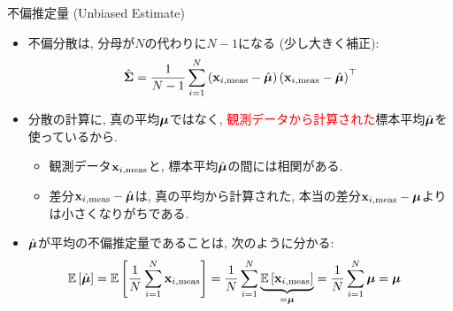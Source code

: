 \documentclass[dvipdfmx,notheorems,t]{beamer}
\begin{document}
\begin{frame}{不偏推定量 (Unbiased Estimate)}
\begin{itemize}
  \item 不偏分散は, 分母が$N$の代わりに$N - 1$になる (少し大きく補正):
  \begin{align*}
    \hat{\vb{\Sigma}} = \frac{1}{N - 1} \sum_{i = 1}^N
      \left( \vb{x}_{i, \mathrm{meas}} - \hat{\vb*{\mu}} \right)
      \left( \vb{x}_{i, \mathrm{meas}} - \hat{\vb*{\mu}} \right)^\top
  \end{align*}
  \item 分散の計算に, 真の平均$\vb*{\mu}$ではなく,
  \textcolor{red}{観測データから計算された}標本平均$\hat{\vb*{\mu}}$を使っているから.
  \begin{itemize}
    \item 観測データ$\vb{x}_{i, \mathrm{meas}}$と, 標本平均$\hat{\vb*{\mu}}$の間には相関がある.
    \item 差分$\vb{x}_{i, \mathrm{meas}} - \hat{\vb*{\mu}}$は,
    真の平均から計算された, 本当の差分$\vb{x}_{i, \mathrm{meas}} - \vb*{\mu}$よりは小さくなりがちである.
  \end{itemize}
  \item $\hat{\vb*{\mu}}$が平均の不偏推定量であることは, 次のように分かる:
  \begin{align*}
    \operatorname{\mathbb{E}} \left[ \hat{\vb*{\mu}} \right] &= \operatorname{\mathbb{E}} \left[ \frac{1}{N} \sum_{i = 1}^N \vb{x}_{i, \mathrm{meas}} \right]
      = \frac{1}{N} \sum_{i = 1}^N \underbrace{\operatorname{\mathbb{E}} \left[ \vb{x}_{i, \mathrm{meas}} \right]}_{=\vb*{\mu}}
      = \frac{1}{N} \sum_{i = 1}^N \vb*{\mu} = \vb*{\mu}
  \end{align*}
\end{itemize}
\end{frame}
\end{document}
